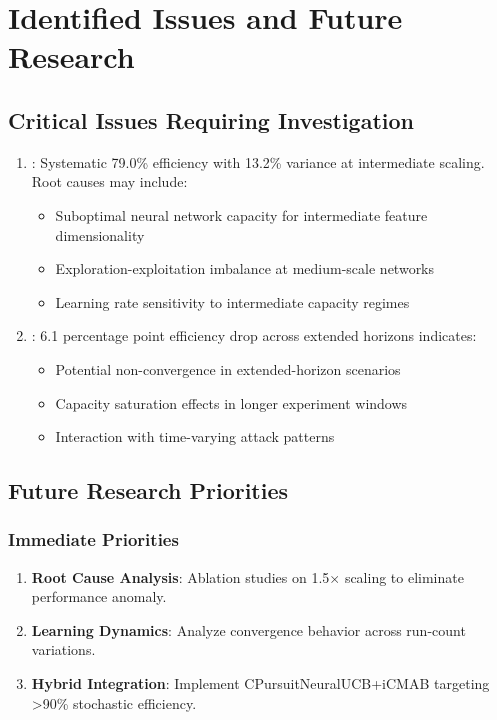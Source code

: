 \documentclass[12pt,a4paper]{article}
\begin{document}
\section{Identified Issues and Future Research}

\subsection{Critical Issues Requiring Investigation}

\begin{enumerate}
    \item {}: Systematic 79.0\% efficiency with 13.2\% variance at intermediate scaling. Root causes may include:
    \begin{itemize}
        \item Suboptimal neural network capacity for intermediate feature dimensionality
        \item Exploration-exploitation imbalance at medium-scale networks
        \item Learning rate sensitivity to intermediate capacity regimes
    \end{itemize}

    \item {}: 6.1 percentage point efficiency drop across extended horizons indicates:
    \begin{itemize}
        \item Potential non-convergence in extended-horizon scenarios
        \item Capacity saturation effects in longer experiment windows
        \item Interaction with time-varying attack patterns
    \end{itemize}
\end{enumerate}

\subsection{Future Research Priorities}

\subsubsection{Immediate Priorities}
\begin{enumerate}
    \item \textbf{Root Cause Analysis}: Ablation studies on 1.5$\times$ scaling to eliminate performance anomaly.
    \item \textbf{Learning Dynamics}: Analyze convergence behavior across run-count variations.
    \item \textbf{Hybrid Integration}: Implement CPursuitNeuralUCB+iCMAB targeting >90\% stochastic efficiency.
\end{enumerate}
\end{document}
